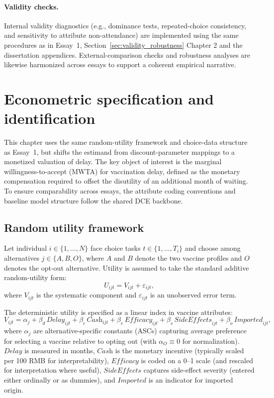 \documentclass[doublespacing]{utdthesis}
\begin{document}
\paragraph{Validity checks.}
Internal validity diagnostics (e.g., dominance tests, repeated-choice consistency, and sensitivity to attribute non-attendance) are implemented using the same procedures as in Essay~1, Section~\ref{sec:validity_robustness} Chapter 2 and the dissertation appendices. External-comparison checks and robustness analyses are likewise harmonized across essays to support a coherent empirical narrative.


\section{Econometric specification and identification}
\label{sec:essay2_model}

This chapter uses the same random-utility framework and choice-data structure as Essay~1, but shifts the estimand from discount-parameter mappings to a monetized valuation of delay. The key object of interest is the marginal willingness-to-accept (MWTA) for vaccination delay, defined as the monetary compensation required to offset the disutility of an additional month of waiting. To ensure comparability across essays, the attribute coding conventions and baseline model structure follow the shared DCE backbone.

\subsection{Random utility framework}
Let individual $i \in \{1,\dots,N\}$ face choice tasks $t \in \{1,\dots,T_i\}$ and choose among alternatives $j \in \{A,B,O\}$, where $A$ and $B$ denote the two vaccine profiles and $O$ denotes the opt-out alternative. Utility is assumed to take the standard additive random-utility form:
\begin{equation}
U_{ijt} = V_{ijt} + \varepsilon_{ijt},
\end{equation}
where $V_{ijt}$ is the systematic component and $\varepsilon_{ijt}$ is an unobserved error term.

The deterministic utility is specified as a linear index in vaccine attributes:
\begin{equation}
V_{ijt} = \alpha_j + \beta_{d}\,\textit{Delay}_{ijt}
+ \beta_{c}\,\textit{Cash}_{ijt}
+ \beta_{e}\,\textit{Efficacy}_{ijt}
+ \beta_{s}\,\textit{SideEffects}_{ijt}
+ \beta_{o}\,\textit{Imported}_{ijt},
\label{eq:essay2_Vijt}
\end{equation}
where $\alpha_j$ are alternative-specific constants (ASCs) capturing average preference for selecting a vaccine relative to opting out (with $\alpha_O \equiv 0$ for normalization). $\textit{Delay}$ is measured in months, $\textit{Cash}$ is the monetary incentive (typically scaled per 100 RMB for interpretability), $\textit{Efficacy}$ is coded on a 0--1 scale (and rescaled for interpretation where useful), $\textit{SideEffects}$ captures side-effect severity (entered either ordinally or as dummies), and $\textit{Imported}$ is an indicator for imported origin.
\end{document}
